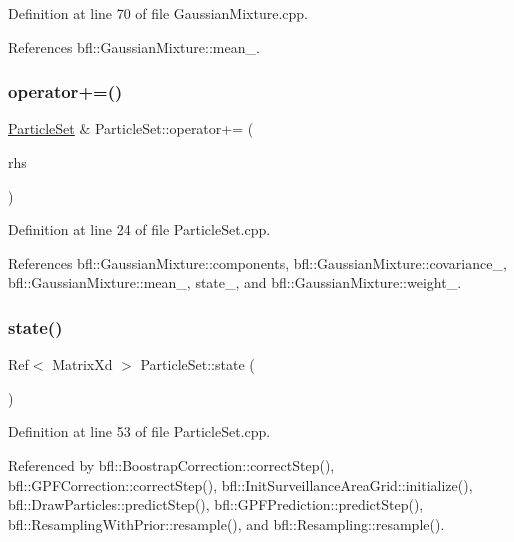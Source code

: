 Definition at line 70 of file Gaussian\+Mixture.\+cpp.



References bfl\+::\+Gaussian\+Mixture\+::mean\+\_\+.

\mbox{\label{classbfl_1_1ParticleSet_a79153d8980f985a33ddf9b4abd40f8ed}} 
\subsubsection{\texorpdfstring{operator+=()}{operator+=()}}
{\footnotesize\ttfamily \mbox{\hyperlink{classbfl_1_1ParticleSet}{Particle\+Set}} \& Particle\+Set\+::operator+= (\begin{DoxyParamCaption}\item[{const \mbox{\hyperlink{classbfl_1_1ParticleSet}{Particle\+Set}} \&}]{rhs }\end{DoxyParamCaption})}



Definition at line 24 of file Particle\+Set.\+cpp.



References bfl\+::\+Gaussian\+Mixture\+::components, bfl\+::\+Gaussian\+Mixture\+::covariance\+\_\+, bfl\+::\+Gaussian\+Mixture\+::mean\+\_\+, state\+\_\+, and bfl\+::\+Gaussian\+Mixture\+::weight\+\_\+.

\mbox{\label{classbfl_1_1ParticleSet_a85950583083c2903f4235801cc03130c}} 
\subsubsection{\texorpdfstring{state()}{state()}\hspace{0.1cm}{\footnotesize\ttfamily [1/6]}}
{\footnotesize\ttfamily Ref$<$ Matrix\+Xd $>$ Particle\+Set\+::state (\begin{DoxyParamCaption}{ }\end{DoxyParamCaption})}



Definition at line 53 of file Particle\+Set.\+cpp.



Referenced by bfl\+::\+Boostrap\+Correction\+::correct\+Step(), bfl\+::\+G\+P\+F\+Correction\+::correct\+Step(), bfl\+::\+Init\+Surveillance\+Area\+Grid\+::initialize(), bfl\+::\+Draw\+Particles\+::predict\+Step(), bfl\+::\+G\+P\+F\+Prediction\+::predict\+Step(), bfl\+::\+Resampling\+With\+Prior\+::resample(), and bfl\+::\+Resampling\+::resample().

